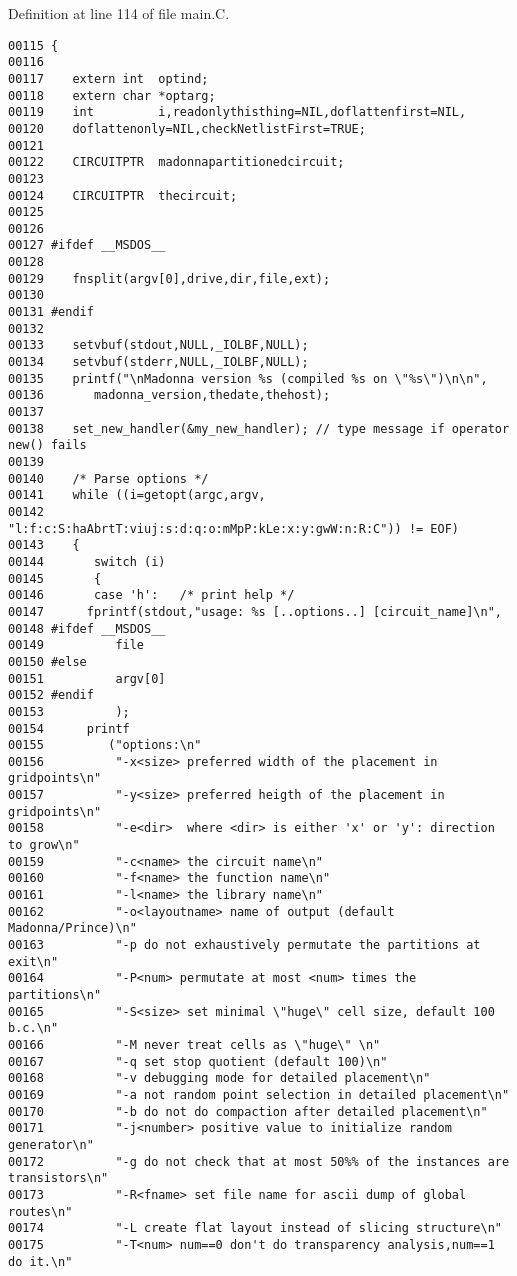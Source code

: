 Definition at line 114 of file main.C.\small\begin{verbatim}00115 {
00116    
00117    extern int  optind;
00118    extern char *optarg;
00119    int         i,readonlythisthing=NIL,doflattenfirst=NIL,
00120    doflattenonly=NIL,checkNetlistFirst=TRUE;
00121    
00122    CIRCUITPTR  madonnapartitionedcircuit;
00123    
00124    CIRCUITPTR  thecircuit;
00125    
00126    
00127 #ifdef __MSDOS__
00128    
00129    fnsplit(argv[0],drive,dir,file,ext);
00130    
00131 #endif
00132    
00133    setvbuf(stdout,NULL,_IOLBF,NULL);
00134    setvbuf(stderr,NULL,_IOLBF,NULL);
00135    printf("\nMadonna version %s (compiled %s on \"%s\")\n\n",
00136       madonna_version,thedate,thehost);
00137 
00138    set_new_handler(&my_new_handler); // type message if operator new() fails
00139 
00140    /* Parse options */
00141    while ((i=getopt(argc,argv,
00142             "l:f:c:S:haAbrtT:viuj:s:d:q:o:mMpP:kLe:x:y:gwW:n:R:C")) != EOF)
00143    {
00144       switch (i)
00145       {
00146       case 'h':   /* print help */
00147      fprintf(stdout,"usage: %s [..options..] [circuit_name]\n",
00148 #ifdef __MSDOS__
00149          file
00150 #else
00151          argv[0]
00152 #endif
00153          );
00154      printf
00155         ("options:\n"
00156          "-x<size> preferred width of the placement in gridpoints\n"
00157          "-y<size> preferred heigth of the placement in gridpoints\n"
00158          "-e<dir>  where <dir> is either 'x' or 'y': direction to grow\n"
00159          "-c<name> the circuit name\n"
00160          "-f<name> the function name\n"
00161          "-l<name> the library name\n"
00162          "-o<layoutname> name of output (default Madonna/Prince)\n"
00163          "-p do not exhaustively permutate the partitions at exit\n"
00164          "-P<num> permutate at most <num> times the partitions\n"
00165          "-S<size> set minimal \"huge\" cell size, default 100 b.c.\n"
00166          "-M never treat cells as \"huge\" \n"
00167          "-q set stop quotient (default 100)\n"
00168          "-v debugging mode for detailed placement\n"
00169          "-a not random point selection in detailed placement\n"
00170          "-b do not do compaction after detailed placement\n"
00171          "-j<number> positive value to initialize random generator\n"
00172          "-g do not check that at most 50%% of the instances are transistors\n"
00173          "-R<fname> set file name for ascii dump of global routes\n"
00174          "-L create flat layout instead of slicing structure\n" 
00175          "-T<num> num==0 don't do transparency analysis,num==1 do it.\n"  

\end{verbatim}
